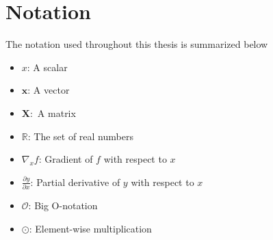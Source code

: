 \documentclass[./main.tex]{subfiles}
\begin{document}
\section{Notation}
The notation used throughout this thesis is summarized below

\begin{itemize}
    \item $x$: A scalar
    \item $\bm{x}$: A vector
    \item $\bm{X}:$ A matrix
    \item $\mathbb{R}$: The set of real numbers
    \item $\nabla_x f$: Gradient of $f$ with respect to $x$
    \item $\frac{\partial y}{\partial x}$: Partial derivative of $y$ with respect to $x$
    \item $\mathcal{O}$: Big O-notation
    \item $\odot$: Element-wise multiplication
\end{itemize}
\end{document}

